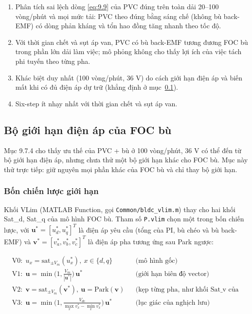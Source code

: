 \begin{enumerate}[leftmargin=*]
\item Phân tích sai lệch dòng \eqref{eq:9.9} của PVC đúng trên toàn dải 20–100 vòng/phút và mọi mức tải: PVC theo đúng bằng sáng chế (không bù back-EMF) có dòng phản kháng và tổn hao đồng tăng nhanh theo tốc độ.
\item Với thời gian chết và sụt áp van, PVC có bù back-EMF tương đương FOC bù trong phần lớn dải làm việc; mô phỏng không cho thấy lợi ích của việc tách phi tuyến theo từng pha.
\item Khác biệt duy nhất (100 vòng/phút, 36 V) do cách giới hạn điện áp và biến mất khi có đủ điện áp dự trữ (khẳng định ở mục~\ref{sec:9.8}).
\item Six-step ít nhạy nhất với thời gian chết và sụt áp van.
\end{enumerate}

\subsection{Bộ giới hạn điện áp của FOC bù}\label{sec:9.8}

Mục 9.7.4 cho thấy ưu thế của PVC + bù ở 100 vòng/phút, 36 V có thể đến từ bộ giới hạn điện áp, nhưng chưa thử một bộ giới hạn khác cho FOC bù. Mục này thử trực tiếp: giữ nguyên mọi phần khác của FOC bù và chỉ thay bộ giới hạn.

\subsubsection{Bốn chiến lược giới hạn}\label{sec:9.8.1}

Khối VLim (MATLAB Function, gọi \texttt{Common/bldc\_vlim.m}) thay cho hai khối Sat\_d, Sat\_q của mô hình FOC bù. Tham số \texttt{P.vlim} chọn một trong bốn chiến lược, với $\mathbf{u}^* = [u_d^*, u_q^*]^T$ là điện áp yêu cầu (tổng của PI, bù chéo và bù back-EMF) và $\mathbf{v}^* = [v_a^*, v_b^*, v_c^*]^T$ là điện áp pha tương ứng sau Park ngược:

\begin{equation}
\begin{aligned}
&\text{V0:}\ \ u_x = \mathrm{sat}_{\pm V_m}(u_x^*),\ x \in \{d, q\} &&\text{(mô hình gốc)}\\
&\text{V1:}\ \ \mathbf{u} = \min\!\Big(1, \tfrac{V_m}{|\mathbf{u}^*|}\Big)\,\mathbf{u}^* &&\text{(giới hạn biên độ vector)}\\
&\text{V2:}\ \ \mathbf{v} = \mathrm{sat}_{\pm V_m}(\mathbf{v}^*),\ \mathbf{u} = \text{Park}(\mathbf{v}) &&\text{(kẹp từng pha, như khối Sat\_v của PVC)}\\
&\text{V3:}\ \ \mathbf{u} = \min\!\Big(1, \tfrac{V_{dc}}{\max_x v_x^* - \min_x v_x^*}\Big)\,\mathbf{u}^* &&\text{(lục giác của nghịch lưu)}
\end{aligned}
\tag{9.13}\label{eq:9.13}
\end{equation}


